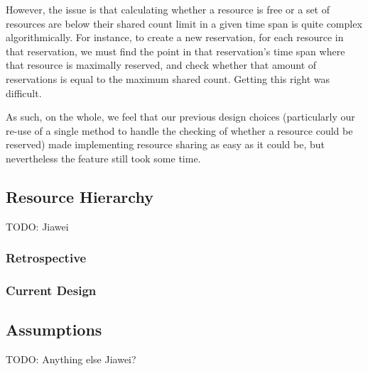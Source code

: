 \documentclass[12pt]{article}
\begin{document}
However, the issue is that calculating whether a resource is free or a set of resources are below their shared count limit in a given time span is quite complex algorithmically. For instance, to create a new reservation, for each resource in that reservation, we must find the point in that reservation's time span where that resource is maximally reserved, and check whether that amount of reservations is equal to the maximum shared count. Getting this right was difficult. 

As such, on the whole, we feel that our previous design choices (particularly our re-use of a single method to handle the checking of whether a resource could be reserved) made implementing resource sharing as easy as it could be, but nevertheless the feature still took some time. 

\subsection{Resource Hierarchy}
{\huge TODO: Jiawei}
\subsubsection{Retrospective}
\subsubsection{Current Design}


\subsection{Assumptions}
{\huge TODO: Anything else Jiawei?}
\end{document}
